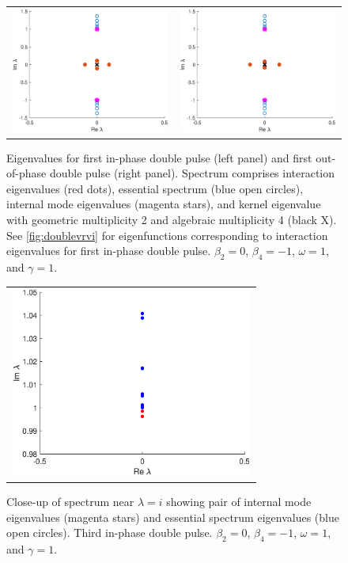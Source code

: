\documentclass[12pt]{elsarticle}
\begin{document}
\begin{figure}[H]
\centering
\begin{tabular}{cc}
\includegraphics[width=8cm]{images/DP1specpp.eps} &
\includegraphics[width=8cm]{images/DP1specmp.eps}
\end{tabular}
\caption{Eigenvalues for first in-phase double pulse (left panel) and first out-of-phase double pulse (right panel). Spectrum comprises interaction eigenvalues (red dots), essential spectrum (blue open circles), internal mode eigenvalues (magenta stars), and kernel eigenvalue with geometric multiplicity 2 and algebraic multiplicity 4 (black X). See \cref{fig:doublevrvi} for eigenfunctions corresponding to interaction eigenvalues for first in-phase double pulse. $\beta_2 = 0$, $\beta_4 = -1$, $\omega = 1$, and $\gamma = 1$.}
\label{fig:doublespec}
\end{figure} 

\begin{figure}[H]
\centering
\begin{tabular}{c}
\includegraphics[width=8cm]{images/DP3internalmode.eps}
\end{tabular}
\caption{Close-up of spectrum near $\lambda = i$ showing pair of internal mode eigenvalues (magenta stars) and essential spectrum eigenvalues (blue open circles). Third in-phase double pulse. $\beta_2 = 0$, $\beta_4 = -1$, $\omega = 1$, and $\gamma = 1$.}
\label{fig:doubleinternalmode}
\end{figure}
\end{document}
